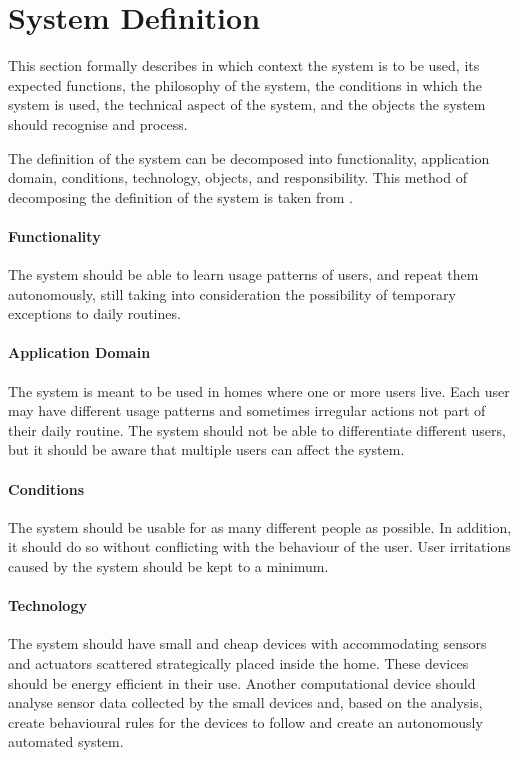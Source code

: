 \section{System Definition}\label{sec:systemDefinition}

This section formally describes in which context the system is to be used, its expected functions, the philosophy of the system, the conditions in which the system is used, the technical aspect of the system, and the objects the system should recognise and process.

The definition of the system can be decomposed into functionality, application domain, conditions, technology, objects, and responsibility. This method of decomposing the definition of the system is taken from \cite{mathiassen2001objektorienteret}.

\paragraph{Functionality}
The system should be able to learn usage patterns of users, and repeat them autonomously, still taking into consideration the possibility of temporary exceptions to daily routines.

\paragraph{Application Domain}
The system is meant to be used in homes where one or more users live. Each user may have different usage patterns and sometimes irregular actions not part of their daily routine. The system should not be able to differentiate different users, but it should be aware that multiple users can affect the system.

\paragraph{Conditions}
The system should be usable for as many different people as possible. In addition, it should do so without conflicting with the behaviour of the user. User irritations caused by the system should be kept to a minimum.

\paragraph{Technology}
The system should have small and cheap devices with accommodating sensors and actuators scattered strategically placed inside the home. These devices should be energy efficient in their use. Another computational device should analyse sensor data collected by the small devices and, based on the analysis, create behavioural rules for the devices to follow and create an autonomously automated system.

